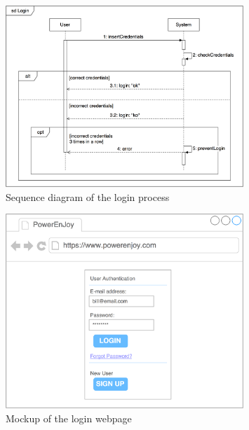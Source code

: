 \begin{figure}[H]
\begin{center}
		\includegraphics[width=0.8\textwidth]{./specific_requirements/features/diagrams/login_sequence.png}
		\caption{Sequence diagram of the login process}
		\label{login_se}
\end{center}
\end{figure}

\begin{figure}[H]
\begin{center}
		\includegraphics[width=0.8\textwidth]{./specific_requirements/features/diagrams/web_login.png}
		\caption{Mockup of the login webpage}
\end{center}
\end{figure}


